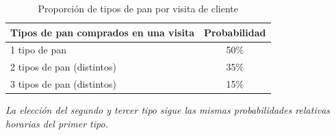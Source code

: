 \documentclass[12pt]{article}
\begin{document}
\begin{table}[h!]
\centering
\caption{Proporción de tipos de pan por visita de cliente}
\renewcommand{\arraystretch}{1.3}
\begin{tabular}{lc}
\toprule
\rowcolor{tabhead}
\color{white}\textbf{Tipos de pan comprados en una visita} & \color{white}\textbf{Probabilidad} \\
\midrule
\rowcolor{tabrow} 1 tipo de pan & 50\% \\
2 tipos de pan (distintos) & 35\% \\
\rowcolor{tabrow} 3 tipos de pan (distintos) & 15\% \\
\bottomrule
\end{tabular}

\footnotesize\textit{La elección del segundo y tercer tipo sigue las mismas probabilidades relativas horarias del primer tipo.}
\end{table}

\end{document}
